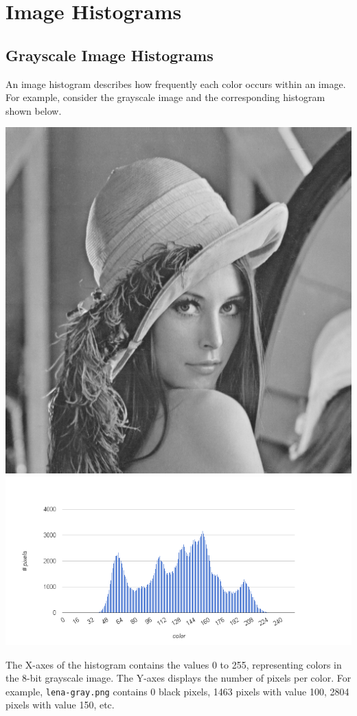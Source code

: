 \documentclass{book}
\begin{document}
\addtocounter{chapter}{2}

\chapter{Image Histograms}

\section{Grayscale Image Histograms}
An image histogram describes how frequently each color occurs within an image. For example, consider the grayscale image and the corresponding histogram shown below.
\begin{center}
\includegraphics[scale=0.15]{lena-gray.png}
\includegraphics[scale=0.5]{lena-gray-histogram.png}
\end{center}
The X-axes of the histogram contains the values 0 to 255, representing colors in the 8-bit grayscale image. The Y-axes displays the number of pixels per color. For example, \texttt{lena-gray.png} contains 0 black pixels, 1463 pixels with value 100, 2804 pixels with value 150, etc.
\end{document}
